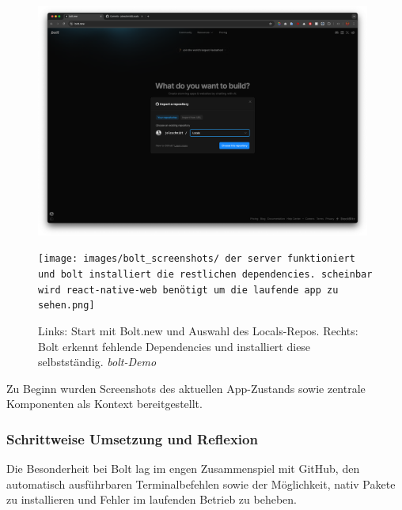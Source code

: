 \begin{figure}[htbp]
      \centering
      \vspace{1em}
      \begin{minipage}{0.48\textwidth}
            \centering
            \includegraphics[width=0.98\textwidth]{images/bolt_screenshots/startseite-what-do-you-wanna-build-mit-github-branch.png}
      \end{minipage}
      \hfill
      \begin{minipage}{0.48\textwidth}
            \centering
            \texttt{[image: images/bolt\_screenshots/ der server funktioniert und bolt installiert die restlichen dependencies. scheinbar wird react-native-web benötigt um die laufende app zu sehen.png]}
      \end{minipage}
      \caption{Links: Start mit Bolt.new und Auswahl des Locals-Repos. Rechts: Bolt erkennt fehlende Dependencies und installiert diese selbstständig. \textit{bolt-Demo}}
      \label{fig:bolt-setup}
\end{figure}

Zu Beginn wurden Screenshots des aktuellen App-Zustands sowie zentrale
Komponenten als Kontext bereitgestellt.

\subsubsection{Schrittweise Umsetzung und Reflexion}
Die Besonderheit bei Bolt lag im engen Zusammenspiel mit GitHub, den
automatisch ausführbaren Terminalbefehlen sowie der Möglichkeit, nativ Pakete
zu installieren und Fehler im laufenden Betrieb zu beheben.

